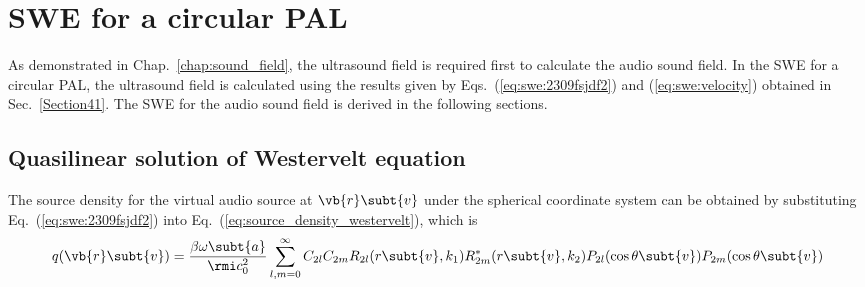 \section{SWE for a circular PAL}
\label{sec:swe_pal}
As demonstrated in Chap.~\ref{chap:sound_field},
the ultrasound field is required first to calculate the audio sound field.
In the SWE for a circular PAL, the ultrasound field is calculated using the results given by Eqs.~(\ref{eq:swe:2309fsjdf2}) and (\ref{eq:swe:velocity}) obtained in Sec.~\ref{Section41}.
The SWE for the audio sound field is derived in the following sections.

\subsection{Quasilinear solution of Westervelt equation}
The source density for the virtual audio source at $\vb{r}\subt{v}$ under the spherical coordinate system can be obtained by substituting Eq.~(\ref{eq:swe:2309fsjdf2}) into Eq.~(\ref{eq:source_density_westervelt}), which is 
\begin{equation}
    q(\vb{r}\subt{v})
    =
    \frac{\beta \omega\subt{a}}{\rmi c_0^2}
    \sum_{l,m=0}^\infty
    C_{2l} C_{2m}
    R_{2l}(r\subt{v},k_1)
    R_{2m}^*(r\subt{v},k_2)
    P_{2l}(\cos\theta\subt{v})
    P_{2m}(\cos\theta\subt{v})
    \label{eq:swe:source_density_westervelt}
\end{equation}

